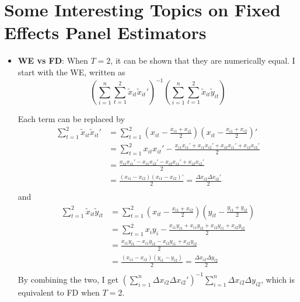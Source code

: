 \section{Some Interesting Topics on Fixed Effects Panel Estimators}
\begin{itemize}
\item \textbf{WE vs FD}: When $T=2$, it can be shown that they are numerically equal. I start with the WE, written as
\[
\left(\sum_{i=1}^n\sum_{t=1}^2\tilde{x}_{it}\tilde{x}_{it}' \right)^{-1}\left(\sum_{i=1}^n\sum_{t=1}^2\tilde{x}_{it}\tilde{y}_{it} \right)
\]\par
Each term can be replaced by
\[
\begin{aligned}
\sum_{t=1}^2\tilde{x}_{it}\tilde{x}_{it}'&=\sum_{t=1}^2\left(x_{it}-\frac{x_{i1}+x_{i2}}{2}\right)\left(x_{it}-\frac{x_{i1}+x_{i2}}{2}\right)'\\
&=\sum_{t=1}^2x_{it}x_{it}'-\frac{x_{i1}x_{i1}'+x_{i1}x_{i2}'+x_{i2}x_{i1}'+x_{i2}x_{i2}'}{2}\\
&=\frac{x_{i1}x_{i1}'-x_{i1}x_{i2}'-x_{i2}x_{i1}'+x_{i2}x_{i2}'}{2}\\
&=\frac{(x_{i1}-x_{i2})(x_{i1}-x_{i2})'}{2}=\frac{\Delta x_{i2} \Delta x_{i2}'}{2}\\
\end{aligned}
\]
and 
\[
\begin{aligned}
\sum_{t=1}^2\tilde{x}_{it}\tilde{y}_{it}&=\sum_{t=1}^2\left(x_{it}-\frac{x_{i1}+x_{i2}}{2}\right)\left(y_{it}-\frac{y_{i1}+y_{i2}}{2}\right)\\
&=\sum_{t=1}^2 x_iy_i - \frac{x_{i1}y_{i1}+x_{i1}y_{i2}+x_{i2}y_{i1}+x_{i2}y_{i2}}{2}\\
&=\frac{x_{i1}y_{i1}-x_{i1}y_{i2}-x_{i2}y_{i1}+x_{i2}y_{i2}}{2}\\
&=\frac{(x_{i1}-x_{i2})(y_{i1}-y_{i2})}{2}=\frac{\Delta x_{i2} \Delta y_{i2}}{2}\\
\end{aligned}
\]
By combining the two, I get $\left(\sum_{i=1}^n \Delta x_{i2}\Delta x_{i2}'\right)^{-1}\sum_{i=1}^n \Delta x_{i2}\Delta y_{i2}$, which is equivalent to FD when $T=2$. 


\end{itemize}
